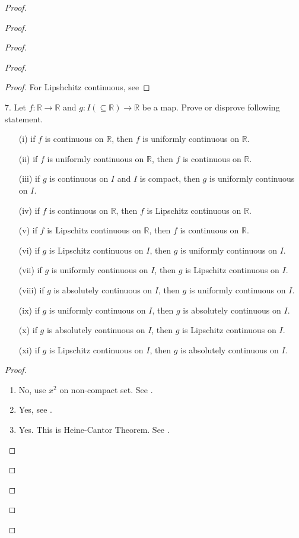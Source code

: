 \documentclass{report}
\begin{document}
\begin{proof}
\begin{proof}
\begin{proof}
\begin{proof}
\begin{proof}
For Lipshchitz continuous, see 
\end{proof}
\begin{question}{}{}
7. Let \( f : \mathbb{R} \rightarrow \mathbb{R} \) and \( g : I (\subseteq \mathbb{R}) \rightarrow \mathbb{R} \) be a map. Prove or disprove following statement.
\begin{itemize}
    \item[(i)] if \( f \) is continuous on \( \mathbb{R} \), then \( f \) is uniformly continuous on \( \mathbb{R} \).
    \item[(ii)] if \( f \) is uniformly continuous on \( \mathbb{R} \), then \( f \) is continuous on \( \mathbb{R} \).
    \item[(iii)] if \( g \) is continuous on \( I \) and \( I \) is compact, then \( g \) is uniformly continuous on \( I \).
    \item[(iv)] if \( f \) is continuous on \( \mathbb{R} \), then \( f \) is Lipschitz continuous on \( \mathbb{R} \).
    \item[(v)] if \( f \) is Lipschitz continuous on \( \mathbb{R} \), then \( f \) is continuous on \( \mathbb{R} \).
    \item[(vi)] if \( g \) is Lipschitz continuous on \( I \), then \( g \) is uniformly continuous on \( I \).
    \item[(vii)] if \( g \) is uniformly continuous on \( I \), then \( g \) is Lipschitz continuous on \( I \).
    \item[(viii)] if \( g \) is absolutely continuous on \( I \), then \( g \) is uniformly continuous on \( I \).
    \item[(ix)] if \( g \) is uniformly continuous on \( I \), then \( g \) is absolutely continuous on \( I \).
    \item[(x)] if \( g \) is absolutely continuous on \( I \), then \( g \) is Lipschitz continuous on \( I \).
    \item[(xi)] if \( g \) is Lipschitz continuous on \( I \), then \( g \) is absolutely continuous on \( I \).
\end{itemize}
\end{question}
\begin{proof}
\begin{enumerate}[label=(\roman*)]
  \item No, use $x^2$ on non-compact set. See .
  \item Yes, see .
  \item Yes. This is Heine-Cantor Theorem. See .

\end{enumerate}
\end{proof}
\end{proof}
\end{proof}
\end{proof}
\end{proof}
\end{document}
